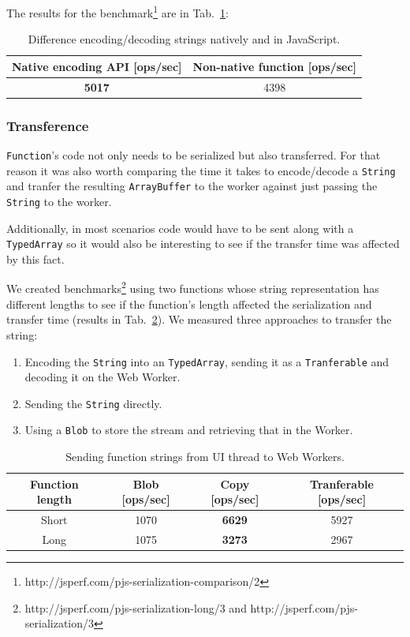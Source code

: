 \documentclass[runningheads,a4paper]{llncs}
\begin{document}
The results for the benchmark\footnote{http://jsperf.com/pjs-serialization-comparison/2} are in Tab.~\ref{tab:encode-decode}:
\begin{table}
  \centering
  \begin{tabular}{|c|c|}
    \hline
    Native encoding API [ops/sec] & Non-native function [ops/sec] \\
    \hline
    \textbf{5017} & 4398 \\
    \hline
  \end{tabular}
  \caption{Difference encoding/decoding strings natively and in JavaScript.}
  \label{tab:encode-decode}
\end{table}

\subsubsection{Transference}
\verb+Function+'s code not only needs to be serialized but also transferred. For that reason it was also worth comparing the time it takes to encode/decode a \verb+String+ and tranfer the resulting \verb+ArrayBuffer+ to the worker against just passing the \verb+String+ to the worker.

Additionally, in most scenarios code would have to be sent along with a \verb+TypedArray+ so it would also be interesting to see if the transfer time was affected by this fact.

We created benchmarks\footnote{http://jsperf.com/pjs-serialization-long/3 and http://jsperf.com/pjs-serialization/3} using two functions whose string representation has different lengths to see if the function's length affected the serialization and transfer time (results in Tab.~\ref{tab:send-function}). We measured three approaches to transfer the string:
\begin{enumerate}
  \item Encoding the \verb+String+ into an \verb+TypedArray+, sending it as a \verb+Tranferable+ and decoding it on the Web Worker.
  \item Sending the \verb+String+ directly.
  \item Using a \verb+Blob+ to store the stream and retrieving that in the Worker.
\end{enumerate}

\begin{table}
  \centering
  \begin{tabular}{|c|c|c|c|}
    \hline
    Function length & Blob [ops/sec] & Copy [ops/sec] & Tranferable [ops/sec] \\
    \hline
    Short & 1070 & \textbf{6629} & 5927 \\
    Long & 1075 & \textbf{3273} & 2967 \\
    \hline
  \end{tabular}
  \caption{Sending function strings from UI thread to Web Workers.}
  \label{tab:send-function}
\end{table}
\end{document}
